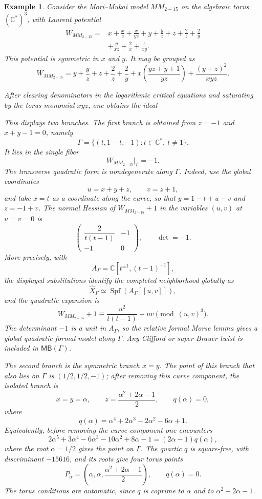 \documentclass[11pt]{amsart}
\newtheorem{example}{Example}[section]
\newcommand{\MBcat}[1]{\mathsf{MB}(#1)}
\newcommand{\fitdisplay}[1]{%
  \begin{center}%
  \resizebox{\textwidth}{!}{$\displaystyle #1$}%
  \end{center}%
}
\begin{document}
\begin{example}
Consider the Mori--Mukai model $MM_{2-15}$ on the algebraic torus
$(\mathbb{C}^*)^3$, with Laurent potential
\begin{align*}
W_{MM_{2-15}}={}&x+\frac{x}{z}+\frac{x}{yz}+y+\frac{y}{z}+z
+\frac{2}{z}+\frac{2}{y} \\
&+\frac{y}{xz}+\frac{2}{x}+\frac{z}{xy}.
\end{align*}
This potential is symmetric in $x$ and $y$. It may be grouped as
\[
W_{MM_{2-15}}
=y+\frac{y}{z}+z+\frac{2}{z}+\frac{2}{y}
+x\left(\frac{yz+y+1}{yz}\right)
+\frac{(y+z)^2}{xyz}.
\]

After clearing denominators in the logarithmic critical equations and
saturating by the torus monomial $xyz$, one obtains the ideal
\fitdisplay{\left(
x+y-z^4+2z^3+z^2-2z-1,
(z+1)(y+z^3-z^2-3z-1),
(z+1)(z^4-3z^2-4z-1)
\right)}
This displays two branches. The first branch is obtained from $z=-1$ and
$x+y-1=0$, namely
\[
\Gamma=\{(t,1-t,-1):t\in\mathbb{C}^*,\ t\neq1\}.
\]
It lies in the single fiber
\[
W_{MM_{2-15}}|_{\Gamma}=-1.
\]
The transverse quadratic form is nondegenerate along $\Gamma$. Indeed, use the
global coordinates
\[
u=x+y+z,
\qquad
v=z+1,
\]
and take $x=t$ as a coordinate along the curve, so that
$y=1-t+u-v$ and $z=-1+v$. The normal Hessian of
$W_{MM_{2-15}}+1$ in the variables $(u,v)$ at $u=v=0$ is
\[
\begin{pmatrix}
\dfrac{2}{t(t-1)} & -1\\
-1 & 0
\end{pmatrix},
\qquad
\det=-1.
\]
More precisely, with
\[
A_{\Gamma}=\mathbb C[t^{\pm1},(t-1)^{-1}],
\]
the displayed substitutions identify the completed neighborhood globally as
\[
\widehat X_{\Gamma}\simeq\operatorname{Spf}(A_{\Gamma}[[u,v]]),
\]
and the quadratic expansion is
\[
W_{MM_{2-15}}+1\equiv \frac{u^2}{t(t-1)}-uv
\pmod{(u,v)^3}.
\]
The determinant $-1$ is a unit in $A_{\Gamma}$, so the relative formal Morse
lemma gives a global quadratic formal model along $\Gamma$. Any Clifford or
super-Brauer twist is included in $\MBcat{\Gamma}$.

The second branch is the symmetric branch $x=y$. The point of this branch that
also lies on $\Gamma$ is $(1/2,1/2,-1)$; after removing this curve component,
the isolated branch is
\[
x=y=\alpha,
\qquad
z=\frac{\alpha^2+2\alpha-1}{2},
\qquad
q(\alpha)=0,
\]
where
\[
q(\alpha)=\alpha^4+2\alpha^3-2\alpha^2-6\alpha+1.
\]
Equivalently, before removing the curve component one encounters
\[
2\alpha^5+3\alpha^4-6\alpha^3-10\alpha^2+8\alpha-1
=(2\alpha-1)q(\alpha),
\]
where the root $\alpha=1/2$ gives the point on $\Gamma$. The quartic $q$ is
square-free, with discriminant $-15616$, and its roots give four torus points
\[
P_{\alpha}=\left(\alpha,\alpha,\frac{\alpha^2+2\alpha-1}{2}\right),
\qquad
q(\alpha)=0.
\]
The torus conditions are automatic, since $q$ is coprime to $\alpha$ and to
$\alpha^2+2\alpha-1$.


\end{example}
\end{document}
